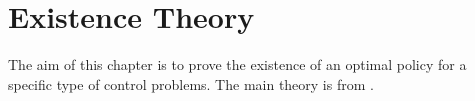 \chapter{Existence Theory} 
    The aim of this chapter is to prove the existence of an optimal policy for 
    a specific type of control problems. The main theory is from 
    \citep{YongDG_ACIntro}.
    
    
    
    
\newpage